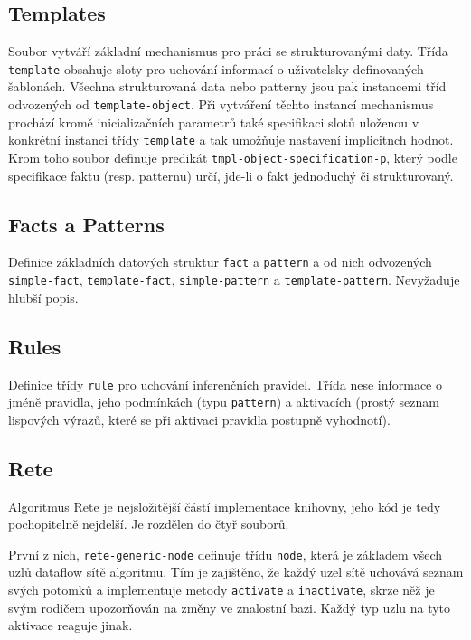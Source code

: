 \subsection{Templates}
Soubor vytváří základní mechanismus pro práci se strukturovanými daty.
Třída \verb|template| obsahuje sloty pro uchování informací o uživatelsky
definovaných šablonách. Všechna strukturovaná data nebo patterny jsou pak
instancemi tříd odvozených od \verb|template-object|. Při vytváření těchto
instancí mechanismus prochází kromě inicializačních parametrů také specifikaci
slotů uloženou v konkrétní instanci třídy \verb|template| a tak umožňuje
nastavení implicitnch hodnot. Krom toho soubor definuje predikát
\verb|tmpl-object-specification-p|, který podle specifikace faktu (resp.
patternu) určí, jde-li o fakt jednoduchý či strukturovaný.
\subsection{Facts a Patterns}
Definice základních datových struktur \verb|fact| a \verb|pattern| a od nich
odvozených \verb|simple-fact|, \verb|template-fact|, \verb|simple-pattern|
a \verb|template-pattern|. Nevyžaduje hlubší popis.
\subsection{Rules}
Definice třídy \verb|rule| pro uchování inferenčních pravidel. Třída nese
informace o jméně pravidla, jeho podmínkách (typu \verb|pattern|) a aktivacích
(prostý seznam lispových výrazů, které se při aktivaci pravidla postupně
vyhodnotí).
\subsection{Rete}
Algoritmus Rete je nejsložitější částí implementace knihovny, jeho kód je tedy
pochopitelně nejdelší. Je rozdělen do čtyř souborů.

První z nich, \verb|rete-generic-node| definuje třídu \verb|node|, která je
základem všech uzlů dataflow sítě algoritmu. Tím je zajištěno, že každý uzel
sítě uchovává seznam svých potomků a implementuje metody \verb|activate|
a \verb|inactivate|, skrze něž je svým rodičem upozorňován na změny ve znalostní
bazi. Každý typ uzlu na tyto aktivace reaguje jinak.

